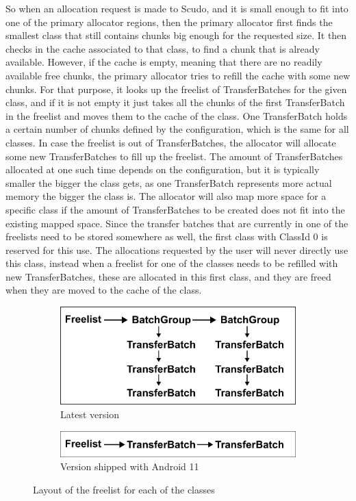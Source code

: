 \documentclass[a4paper,11pt,oneside]{report}
\begin{document}
So when an allocation request is made to Scudo, and it is small enough to fit into
one of the primary allocator regions, then the primary allocator first finds the
smallest class that still contains chunks big enough for the requested size. It
then checks in the cache associated to that class, to find a chunk that is already
available. However, if the cache is empty, meaning that there are no readily
available free chunks, the primary allocator tries to refill the cache with some
new chunks. For that purpose, it looks up the freelist of TransferBatches for the
given class, and if it is not empty it just takes all the chunks of the first
TransferBatch in the freelist and moves them to the cache of the class. One
TransferBatch holds a certain number of chunks defined by the configuration,
which is the same for all classes.
In case the freelist is out of TransferBatches, the allocator will allocate
some new TransferBatches to fill up the freelist. The amount of TransferBatches
allocated at one such time depends on the configuration, but it is typically
smaller the bigger the class gets, as one TransferBatch represents more actual
memory the bigger the class is. The allocator will also map more space for a
specific class if the amount of TransferBatches to be created does not fit into
the existing mapped space.
Since the transfer batches that are currently in one of the freelists need to
be stored somewhere as well, the first class with ClassId 0 is reserved for
this use. The allocations requested by the user will never directly use this
class, instead when a freelist for one of the classes needs to be refilled
with new TransferBatches, these are allocated in this first class, and they
are freed when they are moved to the cache of the class.

\begin{figure}[h!]
  \centering
  \begin{subfigure}{.5\textwidth}
    \centering
    \includegraphics[width=.9\linewidth]{figures/ScudoPrimaryFreelistLatest.png}
    \caption{Latest version}
    \label{fig:ScudoPrimaryFreelistLatest}
  \end{subfigure}%
  \begin{subfigure}{.5\textwidth}
    \centering
    \includegraphics[width=.9\linewidth]{figures/ScudoPrimaryFreelistAndroid.png}
    \caption{Version shipped with Android 11}
    \label{fig:ScudoPrimaryFreelistAndroid}
  \end{subfigure}
  \caption{Layout of the freelist for each of the classes}
  \label{fig:ScudoPrimaryFreelist}
\end{figure}
\end{document}
